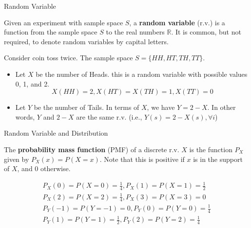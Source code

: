 \documentclass{beamer}
\newcommand{\mbb}[1]{\mathbb{#1}}
\newcommand{\tb}[1]{\textbf{#1}}
\begin{document}
\begin{frame}{Random Variable}
    \begin{definition}
        Given an experiment with sample space $S$, a \tb{random variable} (r.v.) is a function from the sample space $S$ to the real numbers $\mbb{R}$.
        It is common, but not required, to denote random variables by capital letters.
    \end{definition}
    \begin{example}
        Consider coin toss twice. The sample space $S = \{HH, HT, TH, TT\}$.
        \begin{itemize}
            \item{
                Let $X$ be the number of Heads. this is a random variable with possible values 0, 1, and 2.
                \[
                    X(HH) =2, X(HT)=X(TH)=1, X(TT) = 0
                \]
            }
            \item{
                Let $Y$ be the number of Tails. In terms of  $X$, we have $Y=2-X$. In other words, $Y$ and $2-X$ are the same r.v. (i.e., $Y(s)=2-X(s),\forall i$)
            }
        
        \end{itemize}
    \end{example}
\end{frame}

\begin{frame}{Random Variable and Distribution}
    \begin{definition}
        The \tb{probability mass function} (PMF) of a discrete r.v. $X$ is the function $P_X$ given by $P_X(x) = P(X=x)$. Note that this is positive if $x$ is in the support of $X$, and 0 otherwise.
    \end{definition}

    \begin{example}
            \[
                \begin{gathered}
                    P_X(0) = P(X=0) = \frac{1}{4}, P_X(1) = P(X=1) = \frac{1}{2} \\
                    P_X(2) = P(X=2) = \frac{1}{4}, P_X(3) = P(X=3) = 0 \\
                    P_Y(-1) = P(Y=-1) = 0, P_Y(0)=P(Y=0)=\frac{1}{4} \\
                    P_Y(1) = P(Y=1) = \frac{1}{2}, P_Y(2)=P(Y=2)=\frac{1}{4}
                \end{gathered}
            \]
    \end{example}
\end{frame}
\end{document}
